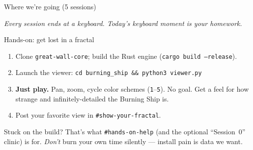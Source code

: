 \documentclass[aspectratio=169,11pt]{beamer}
\begin{document}
\begin{frame}{Where we're going (5 sessions)}
  \begin{center}
  \end{center}
  \vspace{4pt}
  \begin{center}\itshape\color{graytext}
  Every session ends at a keyboard. Today's keyboard moment is your homework.
  \end{center}
\end{frame}

\begin{frame}{Hands-on: get lost in a fractal}
  \begin{tryit}
    \begin{enumerate}\small
      \item Clone \texttt{great-wall-core}; build the Rust engine
        (\texttt{cargo build --release}).
      \item Launch the viewer: \texttt{cd burning\_ship \&\& python3 viewer.py}
      \item \textbf{Just play.} Pan, zoom, cycle color schemes (\texttt{1}--\texttt{5}).
        No goal. Get a feel for how strange and infinitely-detailed the Burning
        Ship is.
      \item Post your favorite view in \texttt{\#show-your-fractal}.
    \end{enumerate}
  \end{tryit}
  Stuck on the build? That's what \texttt{\#hands-on-help} (and the optional
  ``Session~0'' clinic) is for. \emph{Don't} burn your own time silently ---
  install pain is data we want.
\end{frame}
\end{document}
